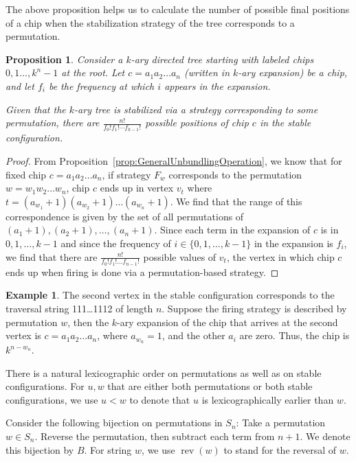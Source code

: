 \documentclass[final]{dmtcs-episciences}
\newtheorem{proposition}[theorem]{Proposition}
\theoremstyle{definition}
\newtheorem{example}{Example}
\theoremstyle{remark}
\DeclareMathOperator{\rev}{rev}
\begin{document}
The above proposition helps us to calculate the number of possible final positions of a chip when the stabilization strategy of the tree corresponds to a permutation.
\begin{proposition} Consider a $k$-ary directed tree starting with labeled chips $0,1 \dots, k^n-1$ at the root. Let $c=a_1a_2\dots a_{n}$ (written in $k$-ary expansion) be a chip, and let $f_i$ be the frequency at which $i$ appears in the expansion.

Given that the $k$-ary tree is stabilized via a strategy corresponding to some permutation, there are $\frac{n!}{f_0! f_1! \cdots f_{k-1}!}$ possible positions of chip $c$ in the stable configuration. 
\end{proposition}
\begin{proof}
    From Proposition~\ref{prop:GeneralUnbundlingOperation}, we know that for fixed chip $c=a_1a_2\dots a_n$, if strategy $F_w$ corresponds to the permutation $w=w_1w_2\dots w_n$, chip $c$ ends up in vertex $v_t$ where $t = (a_{w_1}+1)(a_{w_2}+1)\dots(a_{w_n}+1)$. We find that the range of this correspondence is given by the set of all permutations of $(a_{1}+1),(a_{2}+1),\dots,(a_{n}+1)$. Since each term in the expansion of $c$ is in $0,1, \dots, k-1$ and since the frequency of $i \in \{0,1, \dots, k-1\}$ in the expansion is $f_i$, we find that there are $\frac{n!}{f_0!f_1!\dots f_{n-1}!}$ possible values of $v_t$, the vertex in which chip $c$ ends up when firing is done via a permutation-based strategy.
\end{proof}

\begin{example}
    The second vertex in the stable configuration corresponds to the traversal string 111\ldots 1112 of length $n$. Suppose the firing strategy is described by permutation $w$, then the $k$-ary expansion of the chip that arrives at the second vertex is $c=a_1a_2\dots a_{n}$, where $a_{w_n} = 1$, and the other $a_i$ are zero. Thus, the chip is $k^{n-w_n}$.
\end{example}

There is a natural lexicographic order on permutations as well as on stable configurations. For $u, w$ that are either both permutations or both stable configurations, we use $u < w$ to denote that $u$ is lexicographically earlier than $w$.

Consider the following bijection on permutations in $S_n$: Take a permutation $w \in S_n$. Reverse the permutation, then subtract each term from $n+1$. We denote this bijection by $B$. For string $w$, we use $\rev(w)$ to stand for the reversal of $w$.
\end{document}
